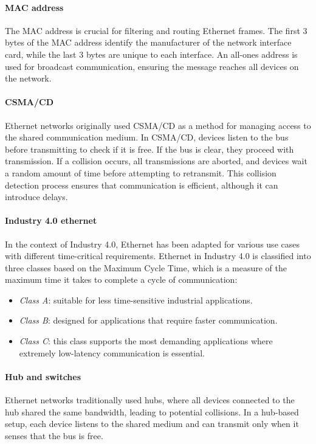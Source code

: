 \paragraph*{MAC address}
The MAC address is crucial for filtering and routing Ethernet frames. 
The first 3 bytes of the MAC address identify the manufacturer of the network interface card, while the last 3 bytes are unique to each interface. 
An all-ones address is used for broadcast communication, ensuring the message reaches all devices on the network.

\paragraph*{CSMA/CD}
Ethernet networks originally used CSMA/CD as a method for managing access to the shared communication medium. 
In CSMA/CD, devices listen to the bus before transmitting to check if it is free. 
If the bus is clear, they proceed with transmission.
If a collision occurs, all transmissions are aborted, and devices wait a random amount of time before attempting to retransmit. 
This collision detection process ensures that communication is efficient, although it can introduce delays.

\paragraph*{Industry 4.0 ethernet}
In the context of Industry 4.0, Ethernet has been adapted for various use cases with different time-critical requirements. 
Ethernet in Industry 4.0 is classified into three classes based on the Maximum Cycle Time, which is a measure of the maximum time it takes to complete a cycle of communication:
\begin{itemize}
    \item \textit{Class A}: suitable for less time-sensitive industrial applications.
    \item \textit{Class B}: designed for applications that require faster communication.
    \item \textit{Class C}: this class supports the most demanding applications where extremely low-latency communication is essential.
\end{itemize}

\paragraph*{Hub and switches}
Ethernet networks traditionally used hubs, where all devices connected to the hub shared the same bandwidth, leading to potential collisions. 
In a hub-based setup, each device listens to the shared medium and can transmit only when it senses that the bus is free.

